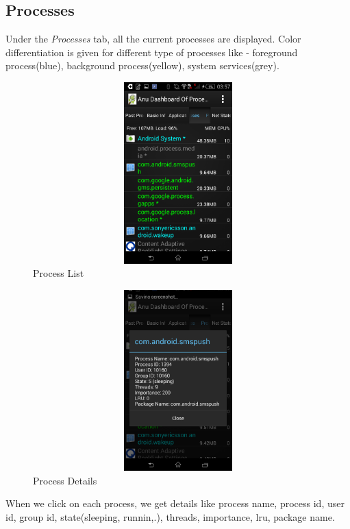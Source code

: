 \documentclass[12pt]{report}
\begin{document}
\subsection{Processes}
Under the \textit{Processes} tab, all the current processes are displayed. Color differentiation is given for different type of processes like - foreground process(blue), background process(yellow), system services(grey).
\begin{figure}[H]
	\centering
	\includegraphics[width=1.0\textwidth,width=5cm,height=7cm]{Process_list}
	\caption{Process List}
\end{figure}
\begin{figure}[H]
	\centering
	\includegraphics[width=1.0\textwidth,width=5cm,height=7cm]{process_details}
	\caption{Process Details}
\end{figure}
When we click on each process, we get details like process name, process id, user id, group id, state(sleeping, runnin,.), threads, importance, lru, package name.
\end{document}
